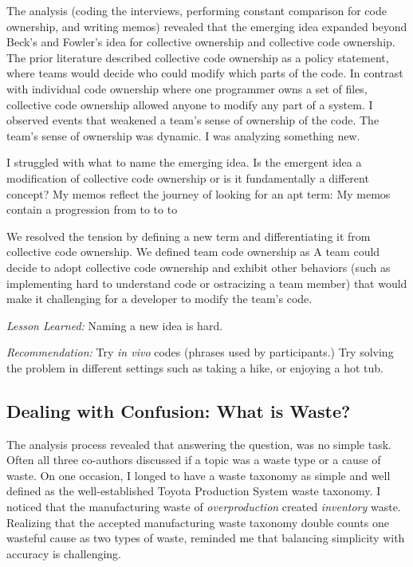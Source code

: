 The analysis (coding the interviews, performing constant comparison for code ownership, and writing memos) revealed that the emerging idea expanded beyond Beck's \cite{BeckExtremeProgramming1999, BeckExtremeProgramming2004} and Fowler's \cite{FowlerCodeOwnership} idea for collective ownership and collective code ownership. The prior literature described collective code ownership as a policy statement, where teams would decide who could modify which parts of the code. In contrast with individual code ownership where one programmer owns a set of files, collective code ownership allowed anyone to modify any part of a system. I observed events that weakened a team's sense of ownership of the code. The team's sense of ownership was dynamic. I was analyzing something new. 

I struggled with what to name the emerging idea. Is the emergent idea a modification of collective code ownership or is it fundamentally a different concept? My memos reflect the  journey of looking for an apt term:  My memos contain a progression from  to  to  to  

We resolved the tension by defining a new term and differentiating it from collective code ownership. We defined team code ownership as  A team could decide to adopt collective code ownership and exhibit other behaviors (such as implementing hard to understand code or ostracizing a team member) that would make it challenging for a developer to modify the team's code.

\textit{Lesson Learned:} Naming a new idea is hard.

\textit{Recommendation:} Try \textit{in vivo} codes (phrases used by participants.) Try solving the problem in different settings such as taking a hike, or enjoying a hot tub.

\subsection{Dealing with Confusion: What is Waste?}
The analysis process revealed that answering the question,  was no simple task. Often all three co-authors discussed if a topic was a waste type or a cause of waste. On one occasion, I longed to have a waste taxonomy as simple and well defined as the well-established Toyota Production System waste taxonomy. I noticed that the manufacturing waste of \textit{overproduction} created \textit{inventory} waste. Realizing that the accepted manufacturing waste taxonomy double counts one wasteful cause as two types of waste, reminded me that balancing simplicity with accuracy is challenging. 

